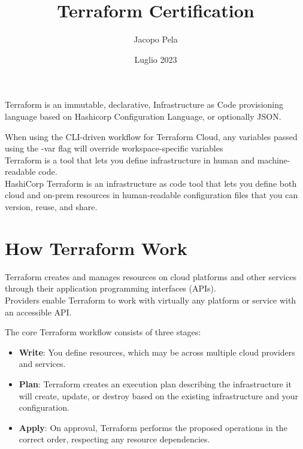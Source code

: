 \documentclass[12pt, letterpaper, twoside]{article}
\title{Terraform Certification}
\author{Jacopo Pela}
\date{Luglio 2023}
\newcommand{\mycomment}[1]{}
\begin{document}
\begin{titlepage}
\maketitle
\end{titlepage}

\tableofcontents
\newpage

Terraform is an immutable, declarative, Infrastructure as Code provisioning language based on Hashicorp Configuration Language, or
optionally JSON.

When using the CLI-driven workflow for Terraform Cloud, any variables passed using the -var flag will override workspace-specific variables\\

\mycomment{Syllabus:\\
VCS: Version Controll System\\
}
Terraform is a tool that lets you define infrastructure in human and machine-readable code.\\
HashiCorp Terraform is an infrastructure as code tool that lets you define both cloud and
on-prem resources in human-readable configuration files that you can version, reuse, and share.\\

\section{How Terraform Work}
Terraform creates and manages resources on cloud platforms and other services 
through their application programming interfaces (APIs).\\
Providers enable Terraform to work with virtually any platform or service with an accessible API.

The core Terraform workflow consists of three stages:\\

\begin{itemize}
    \item\textbf{Write}: You define resources, which may be across multiple cloud 
        providers and services. 
    \item \textbf{Plan}: Terraform creates an execution plan describing the infrastructure it 
        will create, update, or destroy based on the existing infrastructure and your configuration.
    \item \textbf{Apply}: On approval, Terraform performs the proposed operations in the correct order, 
        respecting any resource dependencies.

\end{itemize}
\end{document}
